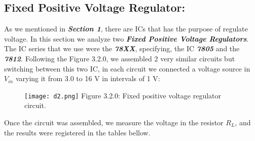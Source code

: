 \subsection{Fixed Positive Voltage Regulator:}

As we mentioned in {\bfseries\itshape Section 1}, there are ICs that has the purpose of regulate voltage. In this section we analyze two {\bfseries\itshape Fixed Positive Voltage Regulators}. The IC series that we use were the {\bfseries\itshape 78XX}, specifying, the IC {\bfseries\itshape 7805} and the {\bfseries\itshape 7812}. Following the Figure 3.2.0, we assembled 2 very similar circuits but switching between this two IC, in each circuit we connected a voltage source in $V_{in}$ varying it from 3.0 to 16 V in intervals of 1 V:

\begin{figure}[H]
\texttt{[image: d2.png]}
\centering \linebreak \linebreak Figure 3.2.0: Fixed positive voltage regulator circuit.
\end{figure}

Once the circuit was assembled, we measure the voltage in the resistor $R_{L}$, and the results were registered in the tables bellow. \hfill \break

{\bfseries\itshape\color{armygreen}{Observation:}} {\itshape{}} \hfill

